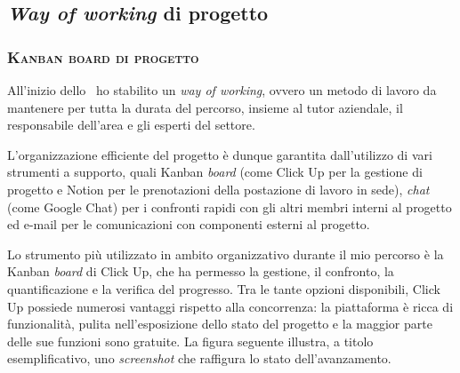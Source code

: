 \subsection{\textit{Way of working} di progetto}

\subsubsection{\textsc{Kanban board di progetto}}

All'inizio dello \stage\ ho stabilito un \textit{way of working}, ovvero un metodo di lavoro da mantenere per tutta la durata del percorso, insieme al tutor aziendale, il responsabile dell'area  e gli esperti del settore.
%

L'organizzazione efficiente del progetto è dunque garantita dall'utilizzo di vari strumenti a supporto, quali Kanban \textit{board} (come Click Up per la gestione di progetto e Notion per le prenotazioni della postazione di lavoro in sede), \textit{chat} (come Google Chat) per i confronti rapidi con gli altri membri interni al progetto ed e-mail per le comunicazioni con componenti esterni al progetto.

Lo strumento più utilizzato in ambito organizzativo durante il mio percorso è la Kanban \textit{board} di Click Up, che ha permesso la gestione, il confronto, la quantificazione e la verifica del progresso.
Tra le tante opzioni disponibili, Click Up possiede numerosi vantaggi rispetto alla concorrenza: la piattaforma è ricca di funzionalità, pulita nell'esposizione dello stato del progetto e la maggior parte delle sue funzioni sono gratuite.
La figura seguente illustra, a titolo esemplificativo, uno \textit{screenshot} che raffigura lo stato dell'avanzamento.

